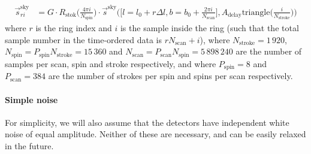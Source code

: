 \documentclass{article}
\begin{document}
\begin{align}
	\vec s^\textrm{sky}_{ri} &= G \cdot
		R_\textrm{stok}\Big(\frac{4\pi i}{N_\textrm{spin}}\Big) \cdot
		\vec s^\textrm{sky}\Big(\Big[l=l_0+r\Delta l,b=b_0+\frac{2\pi i}{N_\textrm{scan}}\Big],
		A_\textrm{delay}\textrm{triangle}\Big(\frac{i}{N_\textrm{stroke}}\Big)\Big)
		\label{eq:sring}
\end{align}
where $r$ is the ring index and $i$ is the sample inside the ring (such
that the total sample number in the time-ordered data is $rN_\textrm{scan}+i$),
where $N_\textrm{stroke} = 1\,920$, $N_\textrm{spin} = P_\textrm{spin}N_\textrm{stroke}
= 15\,360$ and $N_\textrm{scan} = P_\textrm{scan}N_\textrm{spin} = 5\,898\,240$
are the number of samples per scan, spin and stroke respectively, and where
$P_\textrm{spin} = 8$ and $P_\textrm{scan} = 384$ are the number of
strokes per spin and spins per scan respectively.

\paragraph{Simple noise}
For simplicity, we will also assume that the detectors have independent white
noise of equal amplitude. Neither of these are necessary, and can be easily
relaxed in the future.
\end{document}

